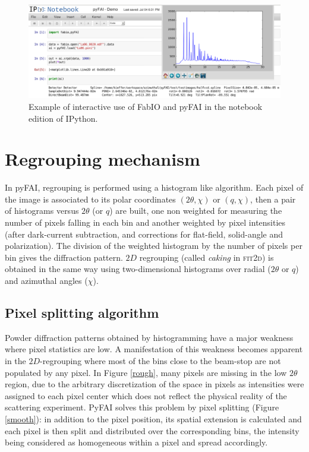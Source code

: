 \documentclass[a4paper]{jpconf}
\begin{document}
\begin{figure}[h]
\begin{center}
\includegraphics[width=15cm]{img/notebook-l.eps}
\caption{\label{notebook} Example of interactive use of FabIO and pyFAI in the
notebook edition of IPython.}
\end{center}
\end{figure}

\section{Regrouping mechanism}
In pyFAI, regrouping is performed using a histogram like algorithm.
Each pixel of the image is associated to its polar coordinates
$(2\theta , \chi )$ or $(q, \chi )$, then a pair of histograms versus
$2\theta$ (or $q$) are built, one non weighted for measuring the number of
pixels falling in each bin and another weighted by pixel intensities (after
dark-current subtraction, and corrections for flat-field,
solid-angle and polarization).
The division of the weighted histogram by the number of pixels per bin gives
the diffraction pattern.
$2D$ regrouping (called \textit{caking} in \textsc{fit2d}) is obtained in the
same way using two-dimensional histograms over radial ($2\theta$ or $q$) and azimuthal angles
($\chi$).

\subsection{Pixel splitting algorithm}
Powder diffraction patterns obtained by histogramming have a major weakness where
pixel statistics are low.
A manifestation of this weakness becomes apparent in the $2D$-regrouping where
most of the bins close to the beam-stop are not populated by any pixel.
In Figure \ref{rough}, many pixels are missing in the low $2\theta$ region, due
to the arbitrary discretization of the space in pixels as intensities were
assigned to each pixel center which does not reflect the physical reality of the
scattering experiment.
PyFAI solves this problem by pixel splitting (Figure \ref{smooth}): in 
addition to the pixel position, its spatial extension is calculated and each
pixel is then split and distributed over the corresponding bins, the intensity
being considered as homogeneous within a pixel and spread accordingly. 
\end{document}
